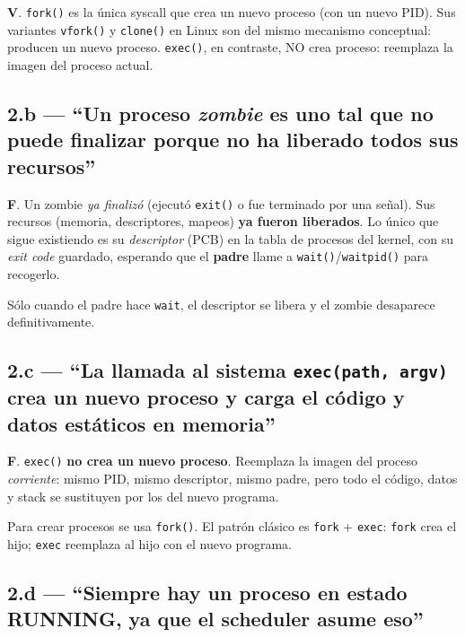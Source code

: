 \documentclass[11pt,a4paper]{article}
\begin{document}
\begin{respuesta}
\textbf{V}. \texttt{fork()} es la única syscall que crea un nuevo
proceso (con un nuevo PID). Sus variantes \texttt{vfork()} y
\texttt{clone()} en Linux son del mismo mecanismo conceptual:
producen un nuevo proceso. \texttt{exec()}, en contraste, NO crea
proceso: reemplaza la imagen del proceso actual.
\end{respuesta}

\subsection*{2.b --- ``Un proceso \emph{zombie} es uno tal que no puede finalizar porque no ha liberado todos sus recursos''}

\begin{respuesta}
\textbf{F}. Un zombie \emph{ya finalizó} (ejecutó \texttt{exit()} o
fue terminado por una señal). Sus recursos (memoria, descriptores,
mapeos) \textbf{ya fueron liberados}. Lo único que sigue existiendo
es su \emph{descriptor} (PCB) en la tabla de procesos del kernel,
con su \emph{exit code} guardado, esperando que el \textbf{padre}
llame a \texttt{wait()}/\texttt{waitpid()} para recogerlo.

Sólo cuando el padre hace \texttt{wait}, el descriptor se libera y
el zombie desaparece definitivamente.
\end{respuesta}

\subsection*{2.c --- ``La llamada al sistema \texttt{exec(path, argv)} crea un nuevo proceso y carga el código y datos estáticos en memoria''}

\begin{respuesta}
\textbf{F}. \texttt{exec()} \textbf{no crea un nuevo proceso}.
Reemplaza la imagen del proceso \emph{corriente}: mismo PID, mismo
descriptor, mismo padre, pero todo el código, datos y stack se
sustituyen por los del nuevo programa.

Para crear procesos se usa \texttt{fork()}. El patrón clásico es
\texttt{fork} + \texttt{exec}: \texttt{fork} crea el hijo;
\texttt{exec} reemplaza al hijo con el nuevo programa.
\end{respuesta}

\subsection*{2.d --- ``Siempre hay un proceso en estado RUNNING, ya que el scheduler asume eso''}
\end{document}
